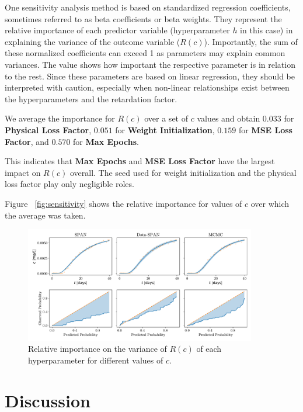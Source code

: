 One sensitivity analysis method is based on standardized regression coefficients, sometimes referred to as beta coefficients or beta weights. They represent the relative importance of each predictor variable (hyperparameter $h$ in this case) in explaining the variance of the outcome variable ($R(c)$).
Importantly, the sum of these normalized coefficients can exceed 1 as parameters may explain common variances. The value shows how important the respective parameter is in relation to the rest.
Since these parameters are based on linear regression, they should be interpreted with caution, especially when non-linear relationships exist between the hyperparameters and the retardation factor.

We average the importance for $R(c)$ over a set of $c$ values and obtain $0.033$ for \textbf{Physical Loss Factor}, $0.051$ for \textbf{Weight Initialization}, $0.159$ for \textbf{MSE Loss Factor}, and $0.570$ for \textbf{Max Epochs}.

This indicates that \textbf{Max Epochs} and \textbf{MSE Loss Factor} have the largest impact on $R(c)$ overall. The seed used for weight initialization and the physical loss factor play only negligible roles.

Figure ~\vref{fig:sensitivity} shows the relative importance for values of $c$ over which the average was taken.


\begin{figure}
    \centering
    \includegraphics[width=0.9\textwidth]{figs/sensitivity.pdf}
    \caption{Relative importance on the variance of $R(c)$ of each hyperparameter for different values of $c$.}
    \label{fig:sensitivity}
\end{figure}



\section{Discussion}

